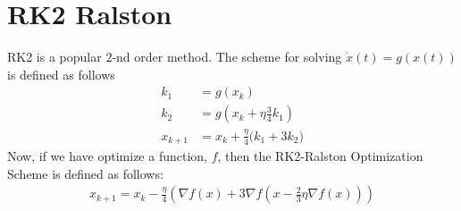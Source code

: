 
\section{RK2 Ralston}
RK2 is a popular $2$-nd order method. The scheme for
solving $\dot{x}(t) = g(x(t))$ is defined as follows
\begin{align*}
k_{1} &= g(x_{k}) \\
k_{2} &= g(x_{k} + \eta \frac{3}{4} k_1) \\
x_{k + 1} &= x_{k} + \frac{\eta}{4} \big( k_{1} + 3 k_{2} \big)
\end{align*}
Now, if we have optimize a function, $f$, then the
RK2-Ralston Optimization Scheme is defined as follows:
\begin{align*}
  x_{k + 1} = x_{k} - \frac{\eta}{4} (\nabla f(x)
  + 3\nabla f(x - \frac{2}{3}\eta \nabla f(x)))
\end{align*}

